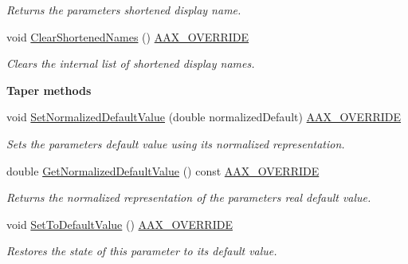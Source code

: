 \begin{Indent}
\begin{DoxyCompactItemize}
\begin{DoxyCompactList}\small\item\em Returns the parameter\textquotesingle{}s shortened display name. \end{DoxyCompactList}\item 
void \mbox{\hyperlink{a01537_aaf64cb6bcfb239dc3d60539bc84aca9d}{Clear\+Shortened\+Names}} () \mbox{\hyperlink{a00392_ac2f24a5172689ae684344abdcce55463}{A\+A\+X\+\_\+\+O\+V\+E\+R\+R\+I\+DE}}
\begin{DoxyCompactList}\small\item\em Clears the internal list of shortened display names. \end{DoxyCompactList}\end{DoxyCompactItemize}
\end{Indent}
\begin{Indent}\textbf{ Taper methods}\par
\begin{DoxyCompactItemize}
\item 
void \mbox{\hyperlink{a01537_aa07573923547b6d2427ad394aac1ca8c}{Set\+Normalized\+Default\+Value}} (double normalized\+Default) \mbox{\hyperlink{a00392_ac2f24a5172689ae684344abdcce55463}{A\+A\+X\+\_\+\+O\+V\+E\+R\+R\+I\+DE}}
\begin{DoxyCompactList}\small\item\em Sets the parameter\textquotesingle{}s default value using its normalized representation. \end{DoxyCompactList}\item 
double \mbox{\hyperlink{a01537_a9897b66c035ec5ae306f641728769abb}{Get\+Normalized\+Default\+Value}} () const \mbox{\hyperlink{a00392_ac2f24a5172689ae684344abdcce55463}{A\+A\+X\+\_\+\+O\+V\+E\+R\+R\+I\+DE}}
\begin{DoxyCompactList}\small\item\em Returns the normalized representation of the parameter\textquotesingle{}s real default value. \end{DoxyCompactList}\item 
void \mbox{\hyperlink{a01537_a9ae87f0a8655c68ac7c59bec3f476c48}{Set\+To\+Default\+Value}} () \mbox{\hyperlink{a00392_ac2f24a5172689ae684344abdcce55463}{A\+A\+X\+\_\+\+O\+V\+E\+R\+R\+I\+DE}}
\begin{DoxyCompactList}\small\item\em Restores the state of this parameter to its default value. \end{DoxyCompactList}\item 

\end{DoxyCompactItemize}
\end{Indent}
